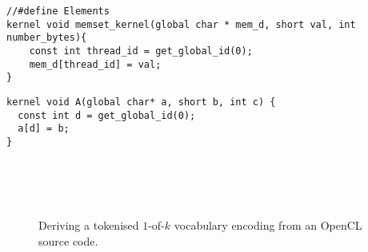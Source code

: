 \newsavebox{\NvidiaStreamClusterInput}
\begin{lrbox}{\NvidiaStreamClusterInput}
  \begin{minipage}{\textwidth}
    \begin{verbatim}
//#define Elements
kernel void memset_kernel(global char * mem_d, short val, int number_bytes){
    const int thread_id = get_global_id(0);
    mem_d[thread_id] = val;
}
    \end{verbatim}
  \end{minipage}
\end{lrbox}

\newsavebox{\NvidiaStreamClusterOutput}
\begin{lrbox}{\NvidiaStreamClusterOutput}
  \begin{minipage}{\textwidth}
    \begin{verbatim}
kernel void A(global char* a, short b, int c) {
  const int d = get_global_id(0);
  a[d] = b;
}
    \end{verbatim}
  \end{minipage}
\end{lrbox}

\begin{figure}
  \centering %
  \\%
  \\%
  \\%
  \caption[Deriving a vocabulary encoding from an OpenCL source code]{%
    Deriving a tokenised $1$-of-$k$ vocabulary encoding from an OpenCL source
    code.%
  }%
  \label{fig:encoding}%
\end{figure}
